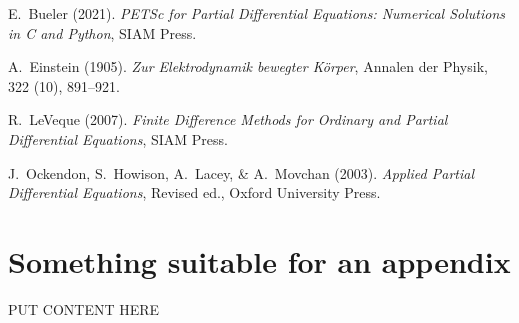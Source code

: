 \documentclass[11pt]{article}
\begin{document}
\begin{thebibliography}{2}  %

E.~Bueler (2021).
\textit{PETSc for Partial Differential Equations: Numerical Solutions in C and Python},
SIAM Press.

A.~Einstein (1905). 
\textit{Zur Elektrodynamik bewegter K{\"o}rper},
Annalen der Physik, 322 (10), 891--921.

R.~LeVeque (2007).
\textit{Finite Difference Methods for Ordinary and Partial Differential Equations},
SIAM Press.

J.~Ockendon, S.~Howison, A.~Lacey, \& A.~Movchan (2003).
\textit{Applied Partial Differential Equations},
Revised ed., Oxford University Press.

\end{thebibliography}

\appendix
\section{Something suitable for an appendix}  PUT CONTENT HERE
\end{document}
